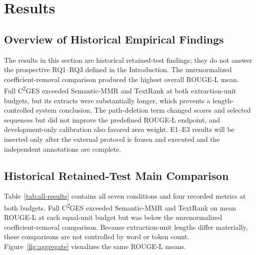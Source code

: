 \documentclass[applsci,article,submit,moreauthors]{Definitions/mdpi}
\newcommand{\cges}{C\textsuperscript{2}GES}
\begin{document}
\section{Results}

\subsection{Overview of Historical Empirical Findings}

The results in this section are historical retained-test findings; they do not answer the prospective RQ1--RQ3 defined in the Introduction. The unrenormalized coefficient-removal comparison produced the highest overall ROUGE-L mean. Full \cges{} exceeded Semantic-MMR and TextRank at both extraction-unit budgets, but its extracts were substantially longer, which prevents a length-controlled system conclusion. The path-deletion term changed scores and selected sequences but did not improve the predefined ROUGE-L endpoint, and development-only calibration also favored zero weight. E1--E3 results will be inserted only after the external protocol is frozen and executed and the independent annotations are complete.

\subsection{Historical Retained-Test Main Comparison}

Table~\ref{tab:all-results} contains all seven conditions and four recorded metrics at both budgets. Full \cges{} exceeded Semantic-MMR and TextRank on mean ROUGE-L at each equal-unit budget but was below the unrenormalized coefficient-removal comparison. Because extraction-unit lengths differ materially, these comparisons are not controlled by word or token count. Figure~\ref{fig:aggregate} visualizes the same ROUGE-L means.
\end{document}
